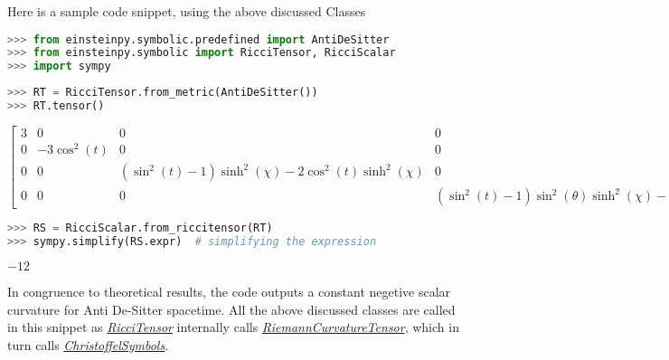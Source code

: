 \documentclass{aastex63}
\begin{document}

Here is a sample code snippet, using the above discussed Classes


\begin{lstlisting}[language=Python, caption=Importing Anti De-Sitter metric]
>>> from einsteinpy.symbolic.predefined import AntiDeSitter
>>> from einsteinpy.symbolic import RicciTensor, RicciScalar
>>> import sympy
\end{lstlisting}

\begin{lstlisting}[language=Python, caption=Obtaining Ricci Tensor from the metric]
>>> RT = RicciTensor.from_metric(AntiDeSitter())
>>> RT.tensor()
\end{lstlisting}

\begin{center}
$\displaystyle \left[\begin{matrix}3 & 0 & 0 & 0\\0 & - 3 \cos^{2}{\left(t \right)} & 0 & 0\\0 & 0 & \left(\sin^{2}{\left(t \right)} - 1\right) \sinh^{2}{\left(\chi \right)} - 2 \cos^{2}{\left(t \right)} \sinh^{2}{\left(\chi \right)} & 0\\0 & 0 & 0 & \left(\sin^{2}{\left(t \right)} - 1\right) \sin^{2}{\left(\theta \right)} \sinh^{2}{\left(\chi \right)} - 2 \sin^{2}{\left(\theta \right)} \cos^{2}{\left(t \right)} \sinh^{2}{\left(\chi \right)}\end{matrix}\right]$
\end{center}

\begin{lstlisting}[language=Python, caption=Deriving Ricci(Curvature) Scalar from Ricci Tensor]
>>> RS = RicciScalar.from_riccitensor(RT)
>>> sympy.simplify(RS.expr)  # simplifying the expression
\end{lstlisting}

\begin{center}
$\displaystyle -12$
\end{center}

In congruence to theoretical results, the code outputs a constant negetive scalar curvature for Anti De-Sitter spacetime. All the above discussed classes are called in this snippet as \hyperref[subsubsec:riccitensor]{\textit{RicciTensor}} internally calls \hyperref[subsubsec:riemann]{\textit{RiemannCurvatureTensor}}, which in turn calls \hyperref[subsubsec:chl]{\textit{ChristoffelSymbols}}.
\end{document}
